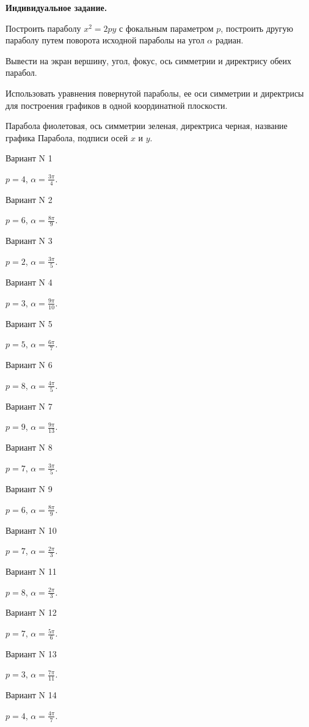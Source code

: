 \documentclass[11pt]{report}
\begin{document}
\pagestyle{empty}

{\bf Индивидуальное задание.}


Построить параболу $x^{2} = 2py$ с фокальным параметром $p$, построить другую параболу путем поворота исходной параболы на угол $\alpha$ радиан.


Вывести на экран вершину, угол, фокус, ось симметрии и директрису обеих парабол.


Использовать уравнения повернутой параболы, ее оси симметрии и директрисы для построения графиков в одной координатной плоскости.


Парабола фиолетовая, ось симметрии зеленая, директриса черная, название графика Парабола, подписи осей $x$ и $y$.

Вариант N 1

$p = 4$, $\alpha = \frac{3 \pi}{4}$.

Вариант N 2

$p = 6$, $\alpha = \frac{8 \pi}{9}$.

Вариант N 3

$p = 2$, $\alpha = \frac{3 \pi}{5}$.

Вариант N 4

$p = 3$, $\alpha = \frac{9 \pi}{10}$.

Вариант N 5

$p = 5$, $\alpha = \frac{6 \pi}{7}$.

Вариант N 6

$p = 8$, $\alpha = \frac{4 \pi}{5}$.

Вариант N 7

$p = 9$, $\alpha = \frac{9 \pi}{13}$.

Вариант N 8

$p = 7$, $\alpha = \frac{3 \pi}{5}$.

Вариант N 9

$p = 6$, $\alpha = \frac{8 \pi}{9}$.

Вариант N 10

$p = 7$, $\alpha = \frac{2 \pi}{3}$.

Вариант N 11

$p = 8$, $\alpha = \frac{2 \pi}{3}$.

Вариант N 12

$p = 7$, $\alpha = \frac{5 \pi}{6}$.

Вариант N 13

$p = 3$, $\alpha = \frac{7 \pi}{11}$.

Вариант N 14

$p = 4$, $\alpha = \frac{4 \pi}{7}$.
\end{document}
